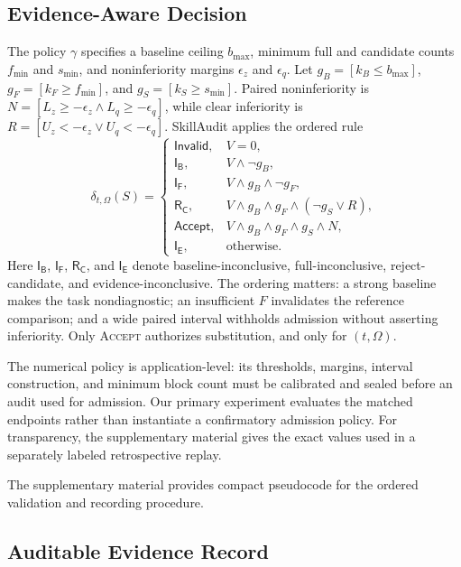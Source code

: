 \subsection{Evidence-Aware Decision}

The policy $\gamma$ specifies a baseline ceiling $b_{\max}$, minimum full and candidate counts $f_{\min}$ and $s_{\min}$, and noninferiority margins $\epsilon_z$ and $\epsilon_q$. Let $g_B=[k_B\le b_{\max}]$, $g_F=[k_F\ge f_{\min}]$, and $g_S=[k_S\ge s_{\min}]$. Paired noninferiority is $N=[L_z\ge-\epsilon_z\land L_q\ge-\epsilon_q]$, while clear inferiority is $R=[U_z<-\epsilon_z\lor U_q<-\epsilon_q]$. SkillAudit applies the ordered rule
\begin{equation}
\delta_{t,\Omega}(S)=
\begin{cases}
\mathsf{Invalid}, & V=0,\\
\mathsf{I_B}, & V\land\neg g_B,\\
\mathsf{I_F}, & V\land g_B\land\neg g_F,\\
\mathsf{R_C}, & V\land g_B\land g_F\land(\neg g_S\lor R),\\
\mathsf{Accept}, & V\land g_B\land g_F\land g_S\land N,\\
\mathsf{I_E}, & \text{otherwise.}
\end{cases}
\label{eq:decision}
\end{equation}
Here $\mathsf{I_B}$, $\mathsf{I_F}$, $\mathsf{R_C}$, and $\mathsf{I_E}$ denote baseline-inconclusive, full-inconclusive, reject-candidate, and evidence-inconclusive. The ordering matters: a strong baseline makes the task nondiagnostic; an insufficient $F$ invalidates the reference comparison; and a wide paired interval withholds admission without asserting inferiority. Only \textsc{Accept} authorizes substitution, and only for $(t,\Omega)$.

The numerical policy is application-level: its thresholds, margins, interval construction, and minimum block count must be calibrated and sealed before an audit used for admission. Our primary experiment evaluates the matched endpoints rather than instantiate a confirmatory admission policy. For transparency, the supplementary material gives the exact values used in a separately labeled retrospective replay.

The supplementary material provides compact pseudocode for the ordered validation and recording procedure.

\subsection{Auditable Evidence Record}

